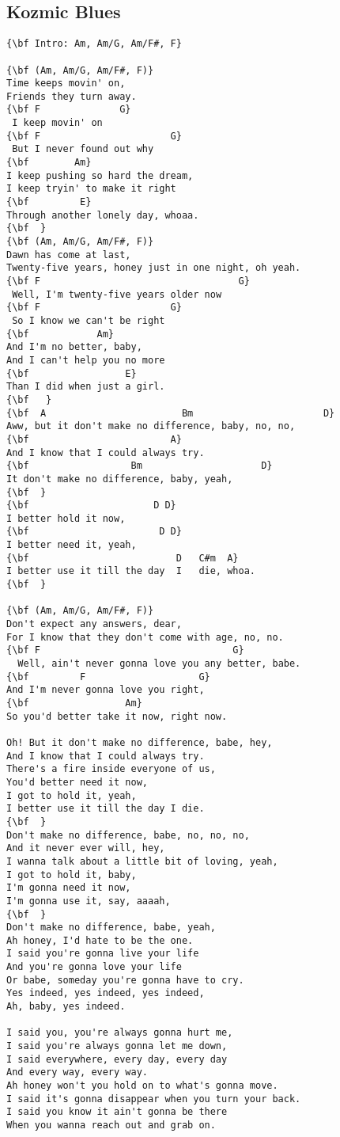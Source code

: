 \documentclass[a4paper]{article}
\begin{document}
\subsection{Kozmic Blues} %
\label{sub:Kozmic Blues}
\begin{Verbatim}[commandchars=\\\{\}]
{\bf Intro: Am, Am/G, Am/F#, F}

{\bf (Am, Am/G, Am/F#, F)}
Time keeps movin' on,
Friends they turn away.
{\bf F              G}
 I keep movin' on
{\bf F                       G}
 But I never found out why
{\bf        Am}
I keep pushing so hard the dream,
I keep tryin' to make it right
{\bf         E}
Through another lonely day, whoaa. 
{\bf  }
{\bf (Am, Am/G, Am/F#, F)}
Dawn has come at last,
Twenty-five years, honey just in one night, oh yeah.
{\bf F                                   G}
 Well, I'm twenty-five years older now
{\bf F                       G}
 So I know we can't be right
{\bf            Am}
And I'm no better, baby,
And I can't help you no more
{\bf                 E}
Than I did when just a girl.
{\bf ￼￼}
{\bf  A                        Bm                       D}
Aww, but it don't make no difference, baby, no, no,
{\bf                         A}
And I know that I could always try.
{\bf                  Bm                     D}
It don't make no difference, baby, yeah,
{\bf ￼}
{\bf                      D D}
I better hold it now,
{\bf                       D D}
I better need it, yeah,
{\bf                          D   C#m  A}
I better use it till the day  I   die, whoa.
{\bf  }

{\bf (Am, Am/G, Am/F#, F)}
Don't expect any answers, dear,
For I know that they don't come with age, no, no.
{\bf F                                  G}
  Well, ain't never gonna love you any better, babe.
{\bf         F                    G}
And I'm never gonna love you right,
{\bf                 Am}
So you'd better take it now, right now.

Oh! But it don't make no difference, babe, hey,
And I know that I could always try.
There's a fire inside everyone of us,
You'd better need it now,
I got to hold it, yeah,
I better use it till the day I die.
{\bf  }
Don't make no difference, babe, no, no, no,
And it never ever will, hey,
I wanna talk about a little bit of loving, yeah,
I got to hold it, baby,
I'm gonna need it now,
I'm gonna use it, say, aaaah,
{\bf  }
Don't make no difference, babe, yeah,
Ah honey, I'd hate to be the one.
I said you're gonna live your life
And you're gonna love your life
Or babe, someday you're gonna have to cry.
Yes indeed, yes indeed, yes indeed,
Ah, baby, yes indeed.

I said you, you're always gonna hurt me,
I said you're always gonna let me down,
I said everywhere, every day, every day
And every way, every way.
Ah honey won't you hold on to what's gonna move.
I said it's gonna disappear when you turn your back.
I said you know it ain't gonna be there
When you wanna reach out and grab on.
\end{Verbatim}
\newpage
\end{document}
